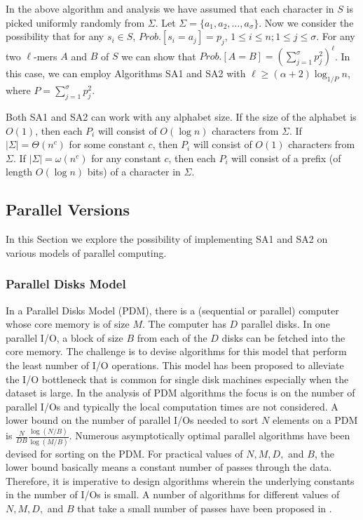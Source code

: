  In the above algorithm
and analysis we have assumed that each character in $S$ is picked uniformly
randomly from $\Sigma$. Let $\Sigma=\{a_1,a_2,\ldots, a_\sigma\}$. Now we
consider the possibility that for any $s_i\in S$, $Prob.[s_i=a_j]=p_j$, $1\leq
i\leq n;1\leq j\leq \sigma$. For any two $\ell$-mers $A$ and $B$ of $S$ we can
show that $Prob.[A=B]=\left (\sum_{j=1}^\sigma p_j^2\right )^\ell$. In this
case, we can employ Algorithms SA1 and SA2 with
$\ell\geq(\alpha+2)\log_{1/P}n$, where $P=\sum_{j=1}^\sigma p_j^2$.


 Both SA1 and SA2 can work with any alphabet size.
If the size of the alphabet is $O(1)$, then each $P_i$ will consist of $O(\log
n)$ characters from $\Sigma$. If $|\Sigma|=\Theta(n^c)$ for some constant $c$,
then $P_i$ will consist of $O(1)$ characters from $\Sigma$. If
$|\Sigma|=\omega(n^c)$ for any constant $c$, then each $P_i$ will consist of a
prefix (of length $O(\log n)$ bits) of a character in $\Sigma$.

\subsection{Parallel Versions}
In this Section we explore the possibility of implementing SA1 and SA2 on various models of parallel computing. 

\subsubsection{Parallel Disks Model}
In a Parallel Disks Model (PDM), there is a (sequential or parallel) computer
whose core memory is of size $M$.  The computer has $D$ parallel disks. In one
parallel I/O, a block of size $B$ from each of the $D$ disks can be fetched
into the core memory. The challenge is to devise algorithms for this model that
perform the least number of I/O operations. This model has been proposed to
alleviate the I/O bottleneck that is common for single disk machines especially
when the dataset is large. In the analysis of PDM algorithms the focus is on
the number of parallel I/Os and typically the local computation times are not
considered. A lower bound on the number of parallel I/Os needed to sort $N$
elements on a PDM is $\frac{N}{DB}\frac{\log(N/B)}{\log(M/B)}$. Numerous
asymptotically optimal parallel algorithms have been devised for sorting on the
PDM. For practical values of $N,M,D,$ and $B$, the lower bound basically means
a constant number of passes through the data. Therefore, it is imperative to
design algorithms wherein the underlying constants in the number of I/Os is
small. A number of algorithms for different values of $N,M,D,$ and $B$ that
take a small number of passes have been proposed in \cite{RaSe08}. 

